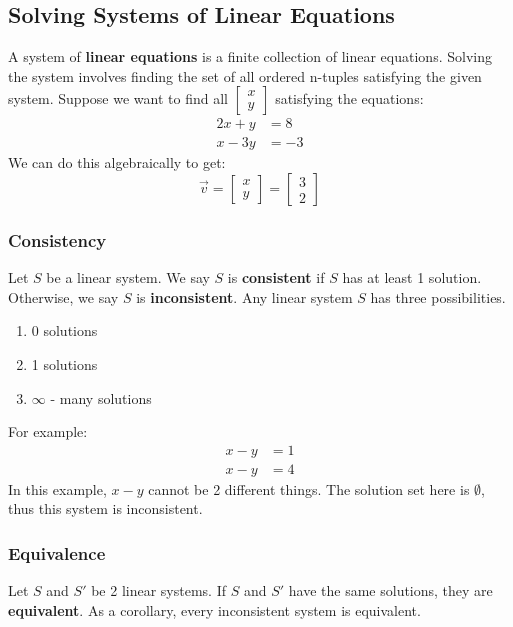 \documentclass{math}
\begin{document}
\subsection*{Solving Systems of Linear Equations}
A system of \textbf{linear equations} is a finite collection of linear
equations. Solving the system involves finding the set of all ordered n-tuples
satisfying the given system. Suppose we want to find all \( \begin{bmatrix}x \\
y\end{bmatrix} \) satisfying the equations:
\begin{align*}
  2x+y &= 8 \\
  x-3y &= -3
\end{align*}
We can do this algebraically to get:
\[ \vec{v} = \begin{bmatrix}x \\ y\end{bmatrix} = \begin{bmatrix}
  3 \\ 2
\end{bmatrix} \]

\subsubsection*{Consistency}
Let \( S \) be a linear system. We say \( S \) is \textbf{consistent} if \( S \)
has at least 1 solution. Otherwise, we say \( S \) is \textbf{inconsistent}.
Any linear system \( S \) has three possibilities.
\begin{enumerate}
  \item 0 solutions
  \item 1 solutions
  \item \( \infty \) - many solutions
\end{enumerate}
For example:
\begin{align*}
  x-y &= 1 \\
  x-y &= 4
\end{align*}
In this example, \( x-y \) cannot be 2 different things. The solution set here
is \( \emptyset \), thus this system is inconsistent.

\subsubsection*{Equivalence}
Let \( S \) and \( S' \) be 2 linear systems. If \( S \) and \( S' \) have the
same solutions, they are \textbf{equivalent}. As a corollary, every inconsistent
system is equivalent.
\end{document}
